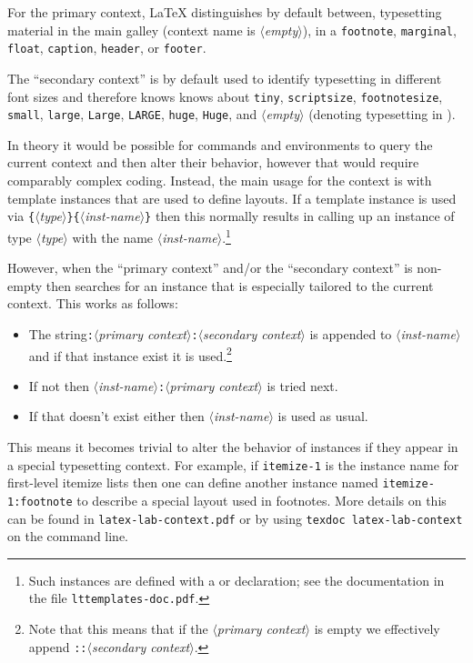 \documentclass{ltnews}
\providecommand\meta[1]{$\langle$\textrm{\itshape#1}$\rangle$}
\providecommand\Arg[1]{\texttt\{\meta{#1}\texttt\}}
\begin{document}
For the primary context, \LaTeX{} distinguishes by default between,
typesetting material in the main galley (context name is
\meta{empty}), in a \texttt{footnote}, \texttt{marginal},
\texttt{float}, \texttt{caption}, \texttt{header}, or \texttt{footer}.

The \enquote{secondary context} is by default used to identify
typesetting in different font sizes and therefore knows knows about
\texttt{tiny}, \texttt{scriptsize}, \texttt{footnotesize},
\texttt{small}, \texttt{large}, \texttt{Large}, \texttt{LARGE},
\texttt{huge}, \texttt{Huge}, and \meta{empty} (denoting typesetting
in ).

In theory it would be possible for commands and environments to query
the current context and then alter their behavior, however that would
require comparably complex coding. Instead, the main usage for the
context is with template instances that are used to define layouts.
If a template instance is used via
\Arg{type}\Arg{inst-name} then this normally results
in calling up an instance of type \meta{type} with the name
\meta{inst-name}.\footnote{Such instances are defined with a
 or  declaration; see the
documentation in the file \texttt{lttemplates-doc.pdf}.}

However, when the \enquote{primary context} and/or the
\enquote{secondary context} is non-empty then 
searches for an instance that is especially tailored to the current
context.  This works as follows:
\begin{itemize}
\item The string\texttt{:}\meta{primary
  context}\texttt{:}\meta{secondary context} is appended to
  \meta{inst-name} and if that instance exist it is
  used.\footnote{Note that this means that if the \meta{primary
    context} is empty we effectively append \texttt{::}\meta{secondary
    context}.}
\item
  If not then \meta{inst-name}\texttt{:}\meta{primary context} is
  tried next.
\item
  If that doesn't exist either then \meta{inst-name} is used as usual.
\end{itemize}
% 
This means it becomes trivial to alter the behavior of instances if
they appear in a special typesetting context. For example, if
\texttt{itemize-1} is the instance name for first-level itemize lists
then one can define another instance named \texttt{itemize-1:footnote}
to describe a special layout used in footnotes.  More details on this
can be found in \texttt{latex-lab-context.pdf} or by using
\verb*=texdoc latex-lab-context= on the command line.
\end{document}
